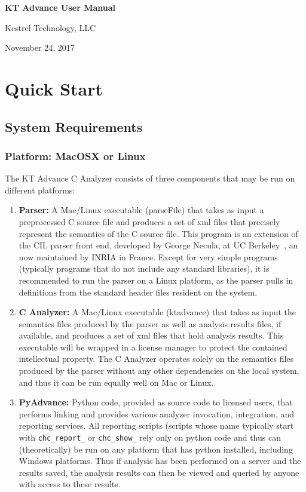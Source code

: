 \documentclass[11pt]{article}
\begin{document}
\vfill
\vfill


{\Large\bf{
KT Advance User Manual}}

\vfill

{\Large{Kestrel Technology, LLC}}

\bigskip

November 24, 2017

\vfill
\vfill
\vfill

\newpage
\tableofcontents
\newpage

\section{Quick Start}

\subsection{System Requirements}

\subsubsection{Platform: MacOSX or Linux}

The KT Advance C Analyzer consists of three components that may be run on
different platforms:
\begin{enumerate}
\item {\bf Parser:} A Mac/Linux executable (parseFile) that takes as input a preprocessed
C source file and produces a set of xml files that precisely represent the
semantics of the C source file. This program is an extension of the CIL
parser front end, developed by George Necula, at UC 
Berkeley~\cite{DBLP:conf/cc/NeculaMRW02}, an now maintained
by INRIA in France. Except for very simple programs (typically programs that do
not include any standard libraries), it is recommended to run the parser on
a Linux platform, as the parser pulls in definitions from the standard header files
resident on the system.
\item {\bf C Analyzer:} A Mac/Linux executable (ktadvance) that takes as input the
semantics files produced by the parser as well as analysis results files, if available, 
and produces a set of xml files that hold analysis results. This executable
will be wrapped in a license manager to protect the contained 
intellectual property. The C Analyzer operates solely on the semantics files produced
by the parser without any other dependencies on the local system, and thus it can be
run equally well on Mac or Linux.
\item {\bf PyAdvance:} Python code, provided as source code to licensed
users, that performs linking and provides various analyzer invocation, 
integration, and reporting services. All reporting scripts (scripts whose name typically
start with {\tt chc\_report\_} or {\tt chc\_show\_} rely only on python code and thus
can (theoretically) be run on any platform that has python installed, including Windows
platforms. Thus if analysis has been performed on a server and the results saved, the 
analysis results can then be viewed and queried by anyone with access to these results.
\end{enumerate}
\end{document}
